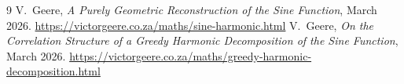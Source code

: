 \documentclass[11pt,a4paper]{article}
\begin{document}
\begin{thebibliography}{9}
V.~Geere, \emph{A Purely Geometric Reconstruction of the Sine Function},
March 2026. \url{https://victorgeere.co.za/maths/sine-harmonic.html}
V.~Geere, \emph{On the Correlation Structure of a Greedy Harmonic Decomposition of the Sine Function},
March 2026. \url{https://victorgeere.co.za/maths/greedy-harmonic-decomposition.html}
\end{thebibliography}
\end{document}
